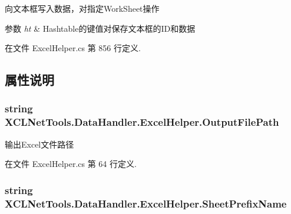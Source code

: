 向文本框写入数据，对指定\-Work\-Sheet操作 


\begin{DoxyParams}{参数}
{\em ht} & Hashtable的键值对保存文本框的\-I\-D和数据\\
\hline
\end{DoxyParams}


在文件 Excel\-Helper.\-cs 第 856 行定义.



\subsection{属性说明}
\hypertarget{class_x_c_l_net_tools_1_1_data_handler_1_1_excel_helper_ada3dfa77cf3ac278ee83281f04707aa3}{
\subsubsection[{Output\-File\-Path}]{\setlength{\rightskip}{0pt plus 5cm}string X\-C\-L\-Net\-Tools.\-Data\-Handler.\-Excel\-Helper.\-Output\-File\-Path\hspace{0.3cm}{\ttfamily [set]}}}\label{class_x_c_l_net_tools_1_1_data_handler_1_1_excel_helper_ada3dfa77cf3ac278ee83281f04707aa3}


输出\-Excel文件路径 



在文件 Excel\-Helper.\-cs 第 64 行定义.

\hypertarget{class_x_c_l_net_tools_1_1_data_handler_1_1_excel_helper_a19d5234b9309942b87041f70bef91647}{
\subsubsection[{Sheet\-Prefix\-Name}]{\setlength{\rightskip}{0pt plus 5cm}string X\-C\-L\-Net\-Tools.\-Data\-Handler.\-Excel\-Helper.\-Sheet\-Prefix\-Name\hspace{0.3cm}{\ttfamily [set]}}}\label{class_x_c_l_net_tools_1_1_data_handler_1_1_excel_helper_a19d5234b9309942b87041f70bef91647}


